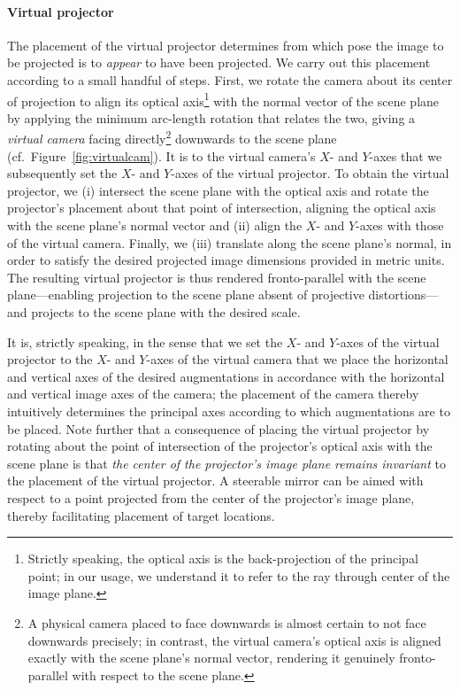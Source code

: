 \documentclass[review]{elsarticle}
\begin{document}
\paragraph{Virtual projector} The placement of the virtual projector determines from which pose the image to be projected is to \textit{appear} to have been projected. We carry out this placement according to a small handful of steps. First, we rotate the camera about its center of projection to align its optical axis\footnote{Strictly speaking, the optical axis is the back-projection of the principal point; in our usage, we understand it to refer to the ray through center of the image plane.} with the normal vector of the scene plane by applying the minimum arc-length rotation that relates the two, giving a \textit{virtual camera} facing directly\footnote{A physical camera placed to face downwards is almost certain to not face downwards precisely; in contrast, the virtual camera's optical axis is aligned exactly with the scene plane's normal vector, rendering it genuinely fronto-parallel with respect to the scene plane.} downwards to the scene plane (cf.\ Figure~\ref{fig:virtualcam}). It is to the virtual camera's $X$- and $Y$-axes that we subsequently set the $X$- and $Y$-axes of the virtual projector. To obtain the virtual projector, we (i) intersect the scene plane with the optical axis and rotate the projector's placement about that point of intersection, aligning the optical axis with the scene plane's normal vector and (ii) align the $X$- and $Y$-axes with those of the virtual camera. Finally, we (iii) translate along the scene plane's normal, in order to satisfy the desired projected image dimensions provided in metric units. The resulting virtual projector is thus rendered fronto-parallel with the scene plane---enabling projection to the scene plane absent of projective distortions---and projects to the scene plane with the desired scale.

It is, strictly speaking, in the sense that we set the $X$- and $Y$-axes of the virtual projector to the $X$- and $Y$-axes of the virtual camera that we place the horizontal and vertical axes of the desired augmentations in accordance with the horizontal and vertical image axes of the camera; the placement of the camera thereby intuitively determines the principal axes according to which augmentations are to be placed. Note further that a consequence of placing the virtual projector by rotating about the point of intersection of the projector's optical axis with the scene plane is that \textit{the center of the projector's image plane remains invariant} to the placement of the virtual projector. A steerable mirror can be aimed with respect to a point projected from the center of the projector's image plane, thereby facilitating placement of target locations.
\end{document}
